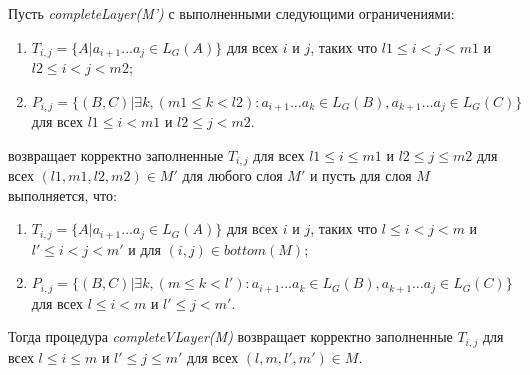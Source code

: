 \documentclass[14pt]{matmex-diploma-custom}
\begin{document}
\begin{lemma}
Пусть \textit{completeLayer(M')} с выполненными следующими ограничениями:
\begin{enumerate}
  \item $T_{i, j} = \{ A |  a_{i + 1} \dots a_{j} \in L_G(A)\}$ для всех $i$ и $j$, таких что $l1 \leq i < j < m1$ и $l2 \leq i < j < m2$;
  \item $P_{i, j} =  \{ (B, C) |\exists k, (m1 \le k < l2): a_{i + 1} \dots a_{k} \in L_G(B), a_{k + 1} \dots a_{j} \in L_G(C)\}$ для всех $l1 \leq i < m1$ и $l2 \leq j < m2$.
\end{enumerate}
возвращает корректно заполненные $T_{i, j}$ для всех $l1 \leq i \le m1$ и $l2 \leq j \le m2$ для всех $(l1, m1, l2, m2) \in M'$ для любого слоя $M'$ 
и пусть для слоя $M$ выполняется, что: 
\begin{enumerate}
  \item $T_{i, j} = \{ A |  a_{i + 1} \dots a_{j} \in L_G(A)\}$ для всех $i$ и $j$, таких что $l \leq i < j < m$ и $l' \leq i < j < m'$ и для $(i, j) \in bottom(M)$;
  \item $P_{i, j} =  \{ (B, C) |\exists k, (m \le k < l'): a_{i + 1} \dots a_{k} \in L_G(B), a_{k + 1} \dots a_{j} \in L_G(C)\}$ для всех $l \leq i < m$ и $l' \leq j < m'$.
\end{enumerate}

Тогда процедура \textit{completeVLayer(M)} возвращает корректно заполненные $T_{i, j}$ для всех $l \leq i \le m$ и $l' \leq j \le m'$ для всех $(l, m, l', m') \in M$. 
\end{lemma}
\end{document}
